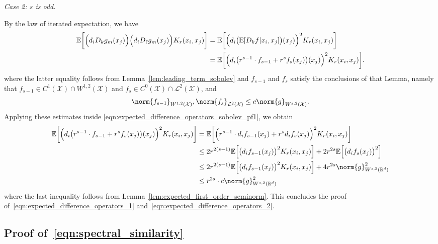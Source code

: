 \documentclass{article}
\newcommand{\Reals}{\mathbb{R}}
\newcommand{\1}{\mathbf{1}}
\newcommand{\Rd}{\Reals^d}
\newcommand{\Xset}{\mathcal{X}}
\newcommand{\Leb}{\mathcal{L}}
\newcommand{\Ebb}{\mathbb{E}}
\theoremstyle{alden}
\theoremstyle{aldenthm}
\theoremstyle{definition}
\theoremstyle{remark}
\begin{document}
\textit{Case 2: $s$ is odd.}

By the law of iterated expectation, we have
\begin{align}
\Ebb\biggl[\Bigl(d_iD_kg_m(x_j)\Bigr) \Bigl(d_iD_{\ell}g_m(x_j)\Bigr) K_r(x_i,x_j)\biggr] & = \Ebb\biggl[\Bigl(d_i\bigl(\Ebb[D_kf|x_i,x_j]\bigr)(x_j)\Bigr)^2K_r(x_i,x_j)\biggr] \nonumber \\
& = \Ebb\biggl[\Bigl(d_i\bigl(r^{s - 1}\cdot f_{s - 1} + r^sf_s(x_j)\bigr)(x_j)\Bigr)^2K_r(x_i,x_j)\biggr]. \label{eqn:expected_difference_operators_sobolev_pf1}
\end{align}
where the latter equality follows from Lemma~\ref{lem:leading_term_sobolev} and $f_{s -1}$ and $f_s$ satisfy the conclusions of that Lemma, namely that $f_{s - 1} \in C^1(\Xset) \cap W^{1,2}(\Xset)$ and $f_s \in C^{0}(\Xset) \cap \Leb^2(\Xset)$, and
\begin{equation*}
\norm{f_{s - 1}}_{W^{1,2}(\Xset)}, \norm{f_s}_{\Leb^2(\Xset)} \leq c \norm{g}_{W^{s,2}(\Xset)}.
\end{equation*}
Applying these estimates inside \eqref{eqn:expected_difference_operators_sobolev_pf1}, we obtain
\begin{align*}
\Ebb\biggl[\Bigl(d_i\bigl(r^{s - 1}\cdot f_{s - 1} + r^s f_s(x_j)\bigr)(x_j)\Bigr)^2K_r(x_i,x_j)\biggr] & = \Ebb\biggl[\Bigl(r^{s - 1} \cdot d_if_{s - 1}(x_j) + r^s d_if_s(x_j)\Bigr)^2K_r(x_i,x_j)\biggr] \\
& \leq 2r^{2(s - 1)} \Ebb\Bigl[\bigl(d_if_{s-1}(x_j)\bigr)^2K_r(x_i,x_j)\Bigr] + 2r^{2s}\Ebb\Bigl[\bigl(d_if_s(x_j)\bigr)^2\Bigr] \\
& \leq 2r^{2(s - 1)} \Ebb\Bigl[\bigl(d_if_{s-1}(x_j)\bigr)^2K_r(x_i,x_j)\Bigr] + 4r^{2s} \norm{g}_{W^{s,2}(\Rd)}^2 \\
& \leq r^{2s} \cdot c\norm{g}_{W^{s,2}(\Rd)}^2
\end{align*}
where the last inequality follows from Lemma~\ref{lem:expected_first_order_seminorm}. This concludes the proof of~\eqref{eqn:expected_difference_operators_1} and~\eqref{eqn:expected_difference_operators_2}.

\subsection{Proof of~\eqref{eqn:spectral_similarity}}
\end{document}

